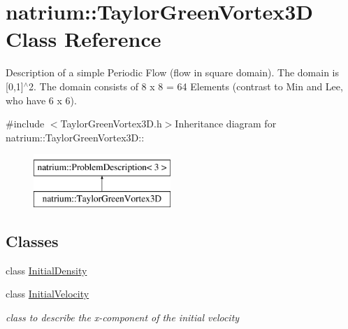 \hypertarget{classnatrium_1_1TaylorGreenVortex3D}{
\section{natrium::TaylorGreenVortex3D Class Reference}
\label{classnatrium_1_1TaylorGreenVortex3D}
}


Description of a simple Periodic Flow (flow in square domain). The domain is \mbox{[}0,1\mbox{]}$^\wedge$2. The domain consists of 8 x 8 = 64 Elements (contrast to Min and Lee, who have 6 x 6).  


{\ttfamily \#include $<$TaylorGreenVortex3D.h$>$}Inheritance diagram for natrium::TaylorGreenVortex3D::\begin{figure}[H]
\begin{center}
\leavevmode
\includegraphics[height=2cm]{classnatrium_1_1TaylorGreenVortex3D}
\end{center}
\end{figure}
\subsection*{Classes}
\begin{DoxyCompactItemize}
\item 
class \hyperlink{classnatrium_1_1TaylorGreenVortex3D_1_1InitialDensity}{InitialDensity}
\item 
class \hyperlink{classnatrium_1_1TaylorGreenVortex3D_1_1InitialVelocity}{InitialVelocity}
\begin{DoxyCompactList}\small\item\em class to describe the x-\/component of the initial velocity \item\end{DoxyCompactList}\end{DoxyCompactItemize}
